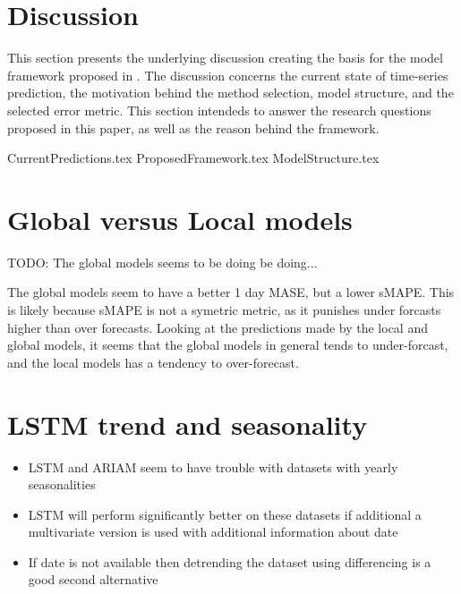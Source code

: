 
\section{Discussion}
\label{section:Discussion:Discussion}


This section presents the underlying discussion creating the basis for the model framework proposed in .
The discussion concerns the current state of time-series prediction, the motivation behind the method selection, model structure, and the selected error metric.
This section intendeds to answer the research questions proposed in this paper,
as well as the reason behind the framework.


{CurrentPredictions.tex}
{ProposedFramework.tex}
{ModelStructure.tex}

\section{Global versus Local models}
TODO:
The global models seems to be doing be doing...

The global models seem to have a better 1 day MASE, but a lower sMAPE.
This is likely because sMAPE is not a symetric metric, as it punishes
under forcasts higher than over forecasts. Looking at the predictions made by
the local and global models, it seems that the global models in general tends to
under-forcast, and the local models has a tendency to over-forecast.

\section{LSTM trend and seasonality}
\begin{itemize}
  \item LSTM and ARIAM seem to have trouble with datasets with yearly seasonalities
  \item {LSTM will perform significantly better on these datasets if additional
        a multivariate version is used with additional information about date}
  \item {If date is not available then detrending the dataset using differencing is a good second alternative}
\end{itemize}


